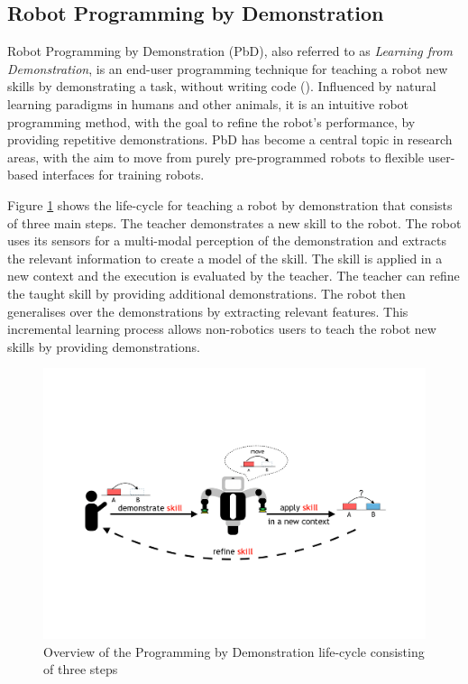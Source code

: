 \subsection{Robot Programming by Demonstration}
Robot Programming by Demonstration (PbD), also referred to as \textit{Learning from Demonstration}, is an end-user programming technique for teaching a robot new skills by demonstrating a task, without writing code (\cite{billard2008robot}).
Influenced by natural learning paradigms in humans and other animals, it is an intuitive robot programming method, with the goal to refine the robot's performance, by providing repetitive demonstrations.
PbD has become a central topic in research areas, with the aim to move from purely pre-programmed robots to flexible user-based interfaces for training robots.

Figure \ref{fig:Principle Overview} shows the life-cycle for teaching a robot by demonstration that consists of three main steps.
The teacher demonstrates a new skill to the robot.
The robot uses its sensors for a multi-modal perception of the demonstration and extracts the relevant information to create a model of the skill.
The skill is applied in a new context and the execution is evaluated by the teacher.
The teacher can refine the taught skill by providing additional demonstrations.
The robot then generalises over the demonstrations by extracting relevant features. %
This incremental learning process allows non-robotics users to teach the robot new skills by providing demonstrations.

\begin{figure}[h]
	\centering
	\includegraphics[width=0.75\linewidth]{figures/PbD-Overview}
	\caption{Overview of the Programming by Demonstration life-cycle consisting of three steps}
	\label{fig:Principle Overview}
\end{figure}

